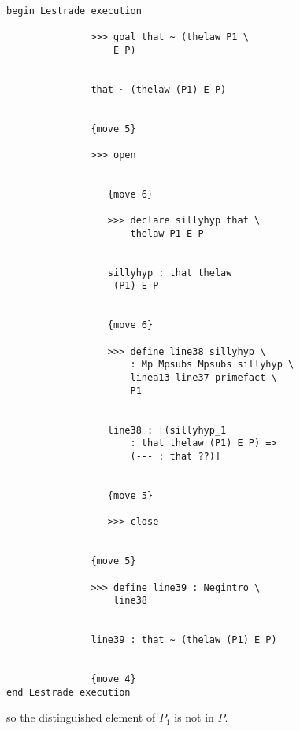 \documentclass[12pt]{article}
\begin{document}
\begin{verbatim}

begin Lestrade execution

               >>> goal that ~ (thelaw P1 \
                   E P)


               that ~ (thelaw (P1) E P)


               {move 5}

               >>> open


                  {move 6}

                  >>> declare sillyhyp that \
                      thelaw P1 E P


                  sillyhyp : that thelaw 
                   (P1) E P


                  {move 6}

                  >>> define line38 sillyhyp \
                      : Mp Mpsubs Mpsubs sillyhyp \
                      linea13 line37 primefact \
                      P1


                  line38 : [(sillyhyp_1 
                      : that thelaw (P1) E P) => 
                      (--- : that ??)]


                  {move 5}

                  >>> close


               {move 5}

               >>> define line39 : Negintro \
                   line38


               line39 : that ~ (thelaw (P1) E P)


               {move 4}
end Lestrade execution
\end{verbatim}

so the distinguished element of $P_1$ is not in $P$.
\end{document}
